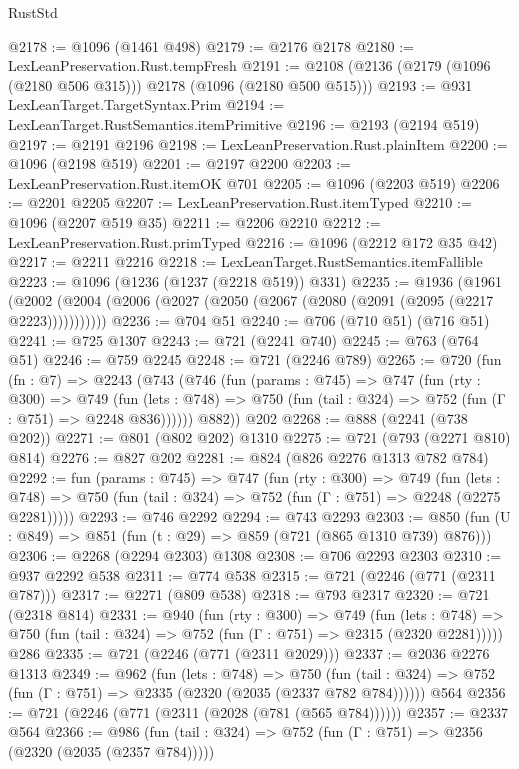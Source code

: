 \begin{lexlean}{RustStd}
\begin{coremodule}
@2178 := @1096 (@1461 @498)
@2179 := @2176 @2178
@2180 := LexLeanPreservation.Rust.tempFresh
@2191 := @2108 (@2136 (@2179 (@1096 (@2180 @506 @315))) @2178 (@1096 (@2180 @500 @515)))
@2193 := @931 LexLeanTarget.TargetSyntax.Prim
@2194 := LexLeanTarget.RustSemantics.itemPrimitive
@2196 := @2193 (@2194 @519)
@2197 := @2191 @2196
@2198 := LexLeanPreservation.Rust.plainItem
@2200 := @1096 (@2198 @519)
@2201 := @2197 @2200
@2203 := LexLeanPreservation.Rust.itemOK @701
@2205 := @1096 (@2203 @519)
@2206 := @2201 @2205
@2207 := LexLeanPreservation.Rust.itemTyped
@2210 := @1096 (@2207 @519 @35)
@2211 := @2206 @2210
@2212 := LexLeanPreservation.Rust.primTyped
@2216 := @1096 (@2212 @172 @35 @42)
@2217 := @2211 @2216
@2218 := LexLeanTarget.RustSemantics.itemFallible
@2223 := @1096 (@1236 (@1237 (@2218 @519)) @331)
@2235 := @1936
    (@1961 (@2002 (@2004 (@2006 (@2027 (@2050 (@2067 (@2080 (@2091 (@2095 (@2217 @2223)))))))))))
@2236 := @704 @51
@2240 := @706 (@710 @51) (@716 @51)
@2241 := @725 @1307
@2243 := @721 (@2241 @740)
@2245 := @763 (@764 @51)
@2246 := @759 @2245
@2248 := @721 (@2246 @789)
@2265 := @720
    (fun (fn : @7) =>
    @2243
      (@743
        (@746
          (fun (params : @745) =>
          @747
            (fun (rty : @300) =>
            @749
              (fun (lets : @748) =>
              @750 (fun (tail : @324) => @752 (fun (Γ : @751) => @2248 @836))))))
        @882))
    @202
@2268 := @888 (@2241 (@738 @202))
@2271 := @801 (@802 @202) @1310
@2275 := @721 (@793 (@2271 @810) @814)
@2276 := @827 @202
@2281 := @824 (@826 @2276 @1313 @782 @784)
@2292 := fun (params : @745) =>
  @747
    (fun (rty : @300) =>
    @749
      (fun (lets : @748) =>
      @750 (fun (tail : @324) => @752 (fun (Γ : @751) => @2248 (@2275 @2281)))))
@2293 := @746 @2292
@2294 := @743 @2293
@2303 := @850 (fun (U : @849) => @851 (fun (t : @29) => @859 (@721 (@865 @1310 @739) @876)))
@2306 := @2268 (@2294 @2303) @1308
@2308 := @706 @2293 @2303
@2310 := @937 @2292 @538
@2311 := @774 @538
@2315 := @721 (@2246 (@771 (@2311 @787)))
@2317 := @2271 (@809 @538)
@2318 := @793 @2317
@2320 := @721 (@2318 @814)
@2331 := @940
    (fun (rty : @300) =>
    @749
      (fun (lets : @748) =>
      @750 (fun (tail : @324) => @752 (fun (Γ : @751) => @2315 (@2320 @2281)))))
    @286
@2335 := @721 (@2246 (@771 (@2311 @2029)))
@2337 := @2036 @2276 @1313
@2349 := @962
    (fun (lets : @748) =>
    @750 (fun (tail : @324) => @752 (fun (Γ : @751) => @2335 (@2320 (@2035 (@2337 @782 @784))))))
    @564
@2356 := @721 (@2246 (@771 (@2311 (@2028 (@781 (@565 @784))))))
@2357 := @2337 @564
@2366 := @986
    (fun (tail : @324) => @752 (fun (Γ : @751) => @2356 (@2320 (@2035 (@2357 @784)))))

\end{coremodule}
\end{lexlean}
